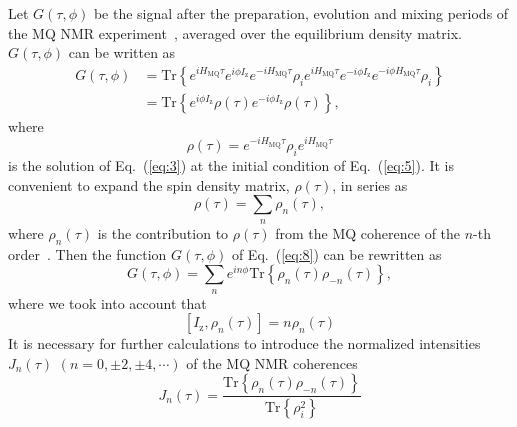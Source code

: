 \documentclass[review]{elsarticle}
\begin{document}
Let   $G(\tau,\phi)$  be the signal after the preparation, evolution and mixing periods of the MQ NMR experiment~\cite{Baum_1985}, averaged over the equilibrium density matrix.  $G(\tau,\phi)$ can be written as~\cite{Doronin_2019} 
%
\begin{equation}
    \begin{split}
        \label{eq:8}
        G(\tau,\phi) 
        & = \mathrm{Tr}\left\{
            e^{i H_\mathrm{MQ} \tau} e^{i\phi I_\mathrm{z}} e^{-i H_\mathrm{MQ}\tau} 
            \rho_i 
            e^{i H_\mathrm{MQ} \tau} e^{-i \phi I_\mathrm{z}} e^{-i \phi H_\mathrm{MQ} \tau} 
            \rho_i 
        \right\} \\
        & = \mathrm{Tr} \left\{
        e^{i \phi I_\mathrm{z}}
        \rho(\tau) 
        e^{-i \phi I_\mathrm{z}} 
        \rho(\tau) 
        \right\},
    \end{split}
\end{equation}
%
where
%
\begin{equation}
    \label{eq:9}
    \rho(\tau) 
    = e^{-i H_\mathrm{MQ} \tau } 
    \rho_i 
    e^{i H_\mathrm{MQ} \tau}
\end{equation}
%
is the solution of Eq.~(\ref{eq:3}) at the initial condition of Eq.~(\ref{eq:5}).
It is convenient to expand the spin density matrix, $\rho(\tau)$, in series as
%
\begin{equation}
    \label{eq:10}
    \rho(\tau) = \sum\limits_n \rho_n(\tau),
\end{equation}
%
where $\rho_{n}(\tau)$ is the contribution to $\rho(\tau)$ from the MQ coherence of the $n$-th order~\cite{Fel_dman_1996}.
Then the function $G(\tau,\phi)$ of Eq.~(\ref{eq:8}) can be rewritten as 
%
\begin{equation}
    \label{eq:11}
    G(\tau,\phi) 
    = \sum\limits_n e^{i n \phi} \mathrm{Tr} \left\{ 
        \rho_{n}(\tau) \rho_{-n}(\tau) 
    \right\},
\end{equation}
%
where we took into account that
%
\begin{equation}
    \label{eq:12}
    \left[ I_{\mathrm{z}},\rho_n(\tau) \right] = n \rho_n(\tau)
\end{equation}
%
It is necessary for further calculations to introduce the normalized intensities $J_{n}(\tau)$ $(n=0, \pm 2, \pm 4, \cdots)$ of the MQ NMR coherences
%
\begin{equation}
    \label{eq:13}
    J_{n}(\tau) = \dfrac{\mathrm{Tr} \left\{
    \rho_{n}(\tau) \rho_{-n}(\tau) 
    \right\}} 
    {\mathrm{Tr} \left\{\rho^2_{i} \right\}}
\end{equation}
\end{document}
